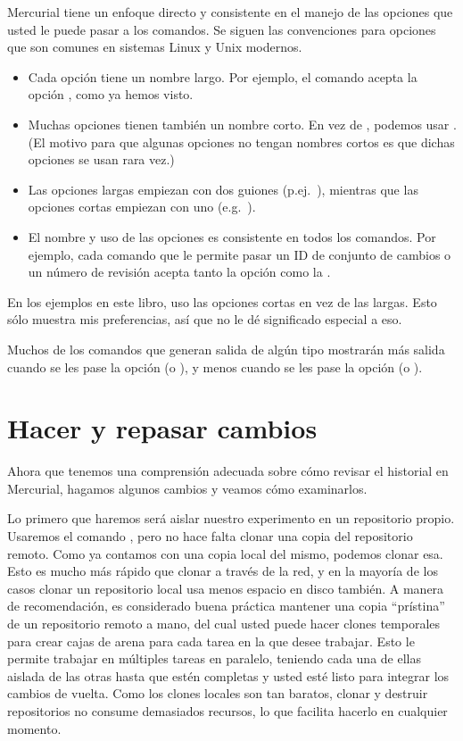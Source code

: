 Mercurial tiene un enfoque directo y consistente en el manejo de las
opciones que usted le puede pasar a los comandos. Se siguen las
convenciones para opciones que son comunes en sistemas Linux y Unix
modernos.
\begin{itemize}
\item Cada opción tiene un nombre largo. Por ejemplo, el comando
     acepta la opción , como ya hemos
    visto.
\item Muchas opciones tienen también un nombre corto. En vez de
    , podemos usar .  (El motivo para
    que algunas opciones no tengan nombres cortos es que dichas
    opciones se usan rara vez.)
\item Las opciones largas empiezan con dos guiones (p.ej.~),
    mientras que las opciones cortas empiezan con uno (e.g.~).
\item El nombre  y uso de las opciones es consistente en todos los
    comandos. Por ejemplo, cada comando que le permite pasar un ID de
    conjunto de cambios o un número de revisión acepta tanto la opción
     como la .
\end{itemize}
En los ejemplos en este libro, uso las opciones cortas en vez de las
largas. Esto sólo muestra mis preferencias, así que no le dé
significado especial a eso.

Muchos de los comandos que generan salida de algún tipo mostrarán más
salida cuando se les pase la opción  (o
), y menos cuando se les pase la opción 
(o ).

\section{Hacer y repasar cambios}

Ahora que tenemos una comprensión adecuada sobre cómo revisar el
historial en Mercurial, hagamos algunos cambios y veamos cómo
examinarlos.

Lo primero que haremos será aislar nuestro experimento en un
repositorio propio. Usaremos el comando , pero no hace
falta clonar una copia del repositorio remoto. Como ya contamos con
una copia local del mismo, podemos clonar esa. Esto es mucho más
rápido que clonar a través de la red, y en la mayoría de los casos
clonar un repositorio local usa menos espacio en disco también.
A manera de recomendación, es considerado buena práctica mantener una
copia ``prístina'' de un repositorio remoto a mano, del cual usted
puede hacer clones temporales para crear cajas de arena para cada
tarea en la que desee trabajar. Esto le permite trabajar en múltiples
tareas en paralelo, teniendo cada una de ellas aislada de las otras
hasta que estén completas y usted esté listo para integrar los cambios
de vuelta. Como los clones locales son tan baratos, clonar y destruir
repositorios no consume demasiados recursos, lo que facilita hacerlo
en cualquier momento.

